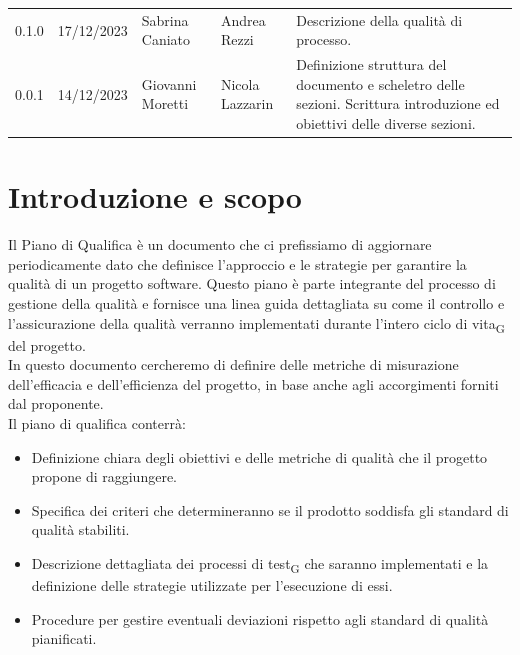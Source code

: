 \documentclass{article}
\begin{document}
\begin{center}
\begin{tabular}{P{4em} P{6em} P{8em} P{8em} P{10em}} 
    0.1.0 & 17/12/2023 & Sabrina Caniato & Andrea Rezzi & Descrizione della qualità di processo. \\
    0.0.1 & 14/12/2023 & Giovanni Moretti & Nicola Lazzarin &  Definizione struttura del documento e scheletro delle sezioni. Scrittura introduzione ed obiettivi delle diverse sezioni.\\
\end{tabular}
\end{center}
\newpage
\tableofcontents
\listoffigures
\listoftables

\newpage
\section{Introduzione e scopo}
Il Piano di Qualifica è un documento che ci prefissiamo di aggiornare periodicamente dato che definisce l'approccio e le strategie per garantire la qualità di un progetto software. Questo piano è parte integrante del processo di gestione della qualità e fornisce una linea guida dettagliata su come il controllo e l'assicurazione della qualità verranno implementati durante l'intero ciclo di vita\textsubscript{G} del progetto.\\
In questo documento cercheremo di definire delle metriche di misurazione dell'efficacia e dell'efficienza del progetto, in base anche agli accorgimenti forniti dal proponente.\\

Il piano di qualifica conterrà:

\begin{itemize}
    \item Definizione chiara degli obiettivi e delle metriche di qualità che il progetto propone di raggiungere.
        
    \item Specifica dei criteri che determineranno se il prodotto soddisfa gli standard di qualità stabiliti.
    
    \item Descrizione dettagliata dei processi di test\textsubscript{G} che saranno implementati e la definizione delle strategie utilizzate per l'esecuzione di essi.

    \item Procedure per gestire eventuali deviazioni rispetto agli standard di qualità pianificati.

\end{itemize}
\end{document}

